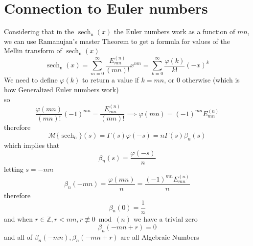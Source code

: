 \documentclass{article}
\DeclareMathOperator{\sech}{sech}
\newcommand{\NotDefinedsech}[2]{\operatorname{\sech_{#1}\text{#2}}}
\begin{document}
\section{Connection to Euler numbers}
Considering that in the $\NotDefinedsech{n}{}(x)$ the Euler numbers work as a function of $mn$, we can use Ramanujan's master Theorem \cite{Amdeberhanetal2012}to get a formula for values of the Mellin transform of $\NotDefinedsech{n}{}(x)$
\[\NotDefinedsech{n}{}(x) = \sum_{m=0}^{\infty}\frac{E^{(n)}_{mn}}{(mn)!}x^{nm} = \sum_{k=0}^{\infty}\frac{\varphi(k)}{k!}(-x)^{k}\]
We need to define $\varphi(k)$ to return a value if $k=mn$, or 0 otherwise (which is how Generalized Euler numbers work)\\
so
\[\frac{\varphi(mn)}{(mn)!}(-1)^{mn} =\frac{E^{(n)}_{mn}}{(mn)!} \implies \varphi(mn) = (-1)^{mn}E^{(n)}_{mn} \]
therefore
\[\mathcal{M}\{\NotDefinedsech{n}{}\}(s) = \Gamma(s)\varphi(-s)= n\Gamma(s)\beta_n(s)\]
which implies that
\[\beta_n(s) = \frac{\varphi(-s)}{n}\]
letting $s=-mn$
\[\beta_n(-mn) = \frac{\varphi(mn)}{n}=\frac{(-1)^{mn}E^{(n)}_{mn}}{n}\]
therefore
\[\beta_n(0) =\frac{1}{n}\]
and when $r\in \mathbb{Z},r<mn,r\not\equiv0 \bmod(n)$ we have a trivial zero
\[\beta_n(-mn+r) = 0\]          
and all of $\beta_n(-mn),\beta_n(-mn+r)$ are all Algebraic Numbers
\end{document}
